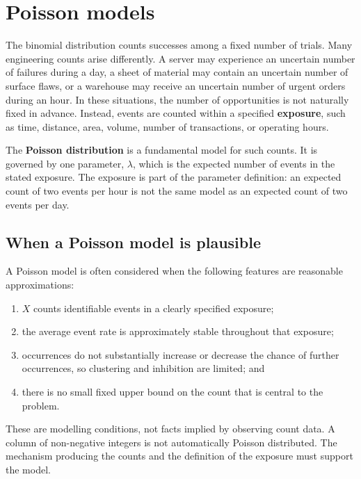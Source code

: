 \clearpage
\section{Poisson models}
\label{sec:poisson-models}

The binomial distribution counts successes among a fixed number of trials. Many engineering counts arise differently. A server may experience an uncertain number of failures during a day, a sheet of material may contain an uncertain number of surface flaws, or a warehouse may receive an uncertain number of urgent orders during an hour. In these situations, the number of opportunities is not naturally fixed in advance. Instead, events are counted within a specified \textbf{exposure}, such as time, distance, area, volume, number of transactions, or operating hours.

The \textbf{Poisson distribution} is a fundamental model for such counts. It is governed by one parameter, $\lambda$, which is the expected number of events in the stated exposure. The exposure is part of the parameter definition: an expected count of two events per hour is not the same model as an expected count of two events per day.

\subsection{When a Poisson model is plausible}

A Poisson model is often considered when the following features are reasonable approximations:

\begin{enumerate}
    \item $X$ counts identifiable events in a clearly specified exposure;
    \item the average event rate is approximately stable throughout that exposure;
    \item occurrences do not substantially increase or decrease the chance of further occurrences, so clustering and inhibition are limited; and
    \item there is no small fixed upper bound on the count that is central to the problem.
\end{enumerate}

These are modelling conditions, not facts implied by observing count data. A column of non-negative integers is not automatically Poisson distributed. The mechanism producing the counts and the definition of the exposure must support the model.

